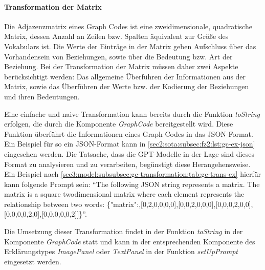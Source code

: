 


\paragraph{Transformation der Matrix}
Die Adjazenzmatrix eines Graph Codes ist eine zweidimensionale, quadratische Matrix, dessen Anzahl an Zeilen bzw. Spalten äquivalent zur Größe des Vokabulars ist.
Die Werte der Einträge in der Matrix geben Aufschluss über das Vorhandensein von Beziehungen, sowie über die Bedeutung bzw. Art der Beziehung.
Bei der Transformation der Matrix müssen daher zwei Aspekte berücksichtigt werden: Das allgemeine Überführen der Informationen aus der Matrix, sowie das Überführen der Werte bzw. der Kodierung der Beziehungen und ihren Bedeutungen.

Eine einfache und naive Transformation kann bereits durch die Funktion \textit{toString} erfolgen, die durch die Komponente \textit{GraphCode} bereitgestellt wird.
Diese Funktion überführt die Informationen eines Graph Codes in das JSON-Format.
Ein Beispiel für so ein JSON-Format kann in \cref{sec2:sota:subsec:fz2:lst:gc-ex-json} eingesehen werden.
Die Tatsache, dass die GPT-Modelle in der Lage sind dieses Format zu analysieren und zu verarbeiten, begünstigt diese Herangehensweise.
Ein Beispiel nach \cref{sec3:model:subsubsec:gc-transformation:tab:gc-trans-ex} hierfür kann folgende Prompt sein: \enquote{The following JSON string represents a matrix. The matrix is a square twodimensional matrix where each element represents the relationship between two words: \{"matrix":\newline[[1,1,1,1,1,1],[0,2,0,0,0,0],[0,0,2,0,0,0],[0,0,0,2,0,0],[0,0,0,0,2,0],[0,0,0,0,0,2]]\}}.

Die Umsetzung dieser Transformation findet in der Funktion \textit{toString} in der Komponente \textit{GraphCode} statt und kann in der entsprechenden Komponente des Erklärungstypes \textit{ImagePanel} oder \textit{TextPanel} in der Funktion \textit{setUpPrompt} eingesetzt werden.


